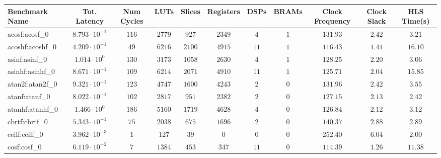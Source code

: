 \begin{tabular}{|l|c|c|c|c|c|c|c|c|c|c|}
\hline
Benchmark Name               & Tot. Latency            & Num Cycles & LUTs       & Slices    & Registers & DSPs    & BRAMs & Clock Frequency & Clock Slack & HLS Time(s) \\
\hline
acosf:acosf\_0               & $ 8.793 \cdot 10^{-1} $ & $ 116    $ & $ 2779   $ & $ 927   $ & $ 2349  $ & $ 4   $ & $ 1 $ & $ 131.93      $ & $ 2.42    $ & $ 3.21    $ \\
acoshf:acoshf\_0             & $ 4.209 \cdot 10^{-1} $ & $ 49     $ & $ 6216   $ & $ 2100  $ & $ 4915  $ & $ 11  $ & $ 1 $ & $ 116.43      $ & $ 1.41    $ & $ 16.10   $ \\
asinf:asinf\_0               & $ 1.014 \cdot 10^{0}  $ & $ 130    $ & $ 3173   $ & $ 1058  $ & $ 2630  $ & $ 4   $ & $ 1 $ & $ 128.25      $ & $ 2.20    $ & $ 3.06    $ \\
asinhf:asinhf\_0             & $ 8.671 \cdot 10^{-1} $ & $ 109    $ & $ 6214   $ & $ 2071  $ & $ 4910  $ & $ 11  $ & $ 1 $ & $ 125.71      $ & $ 2.04    $ & $ 15.85   $ \\
atan2f:atan2f\_0             & $ 9.321 \cdot 10^{-1} $ & $ 123    $ & $ 4747   $ & $ 1600  $ & $ 4243  $ & $ 2   $ & $ 0 $ & $ 131.96      $ & $ 2.42    $ & $ 3.55    $ \\
atanf:atanf\_0               & $ 8.022 \cdot 10^{-1} $ & $ 102    $ & $ 2817   $ & $ 951   $ & $ 2382  $ & $ 2   $ & $ 0 $ & $ 127.15      $ & $ 2.13    $ & $ 2.42    $ \\
atanhf:atanhf\_0             & $ 1.466 \cdot 10^{0}  $ & $ 186    $ & $ 5160   $ & $ 1719  $ & $ 4628  $ & $ 4   $ & $ 0 $ & $ 126.84      $ & $ 2.12    $ & $ 3.12    $ \\
cbrtf:cbrtf\_0               & $ 5.343 \cdot 10^{-1} $ & $ 75     $ & $ 2038   $ & $ 675   $ & $ 1696  $ & $ 2   $ & $ 0 $ & $ 140.37      $ & $ 2.88    $ & $ 2.89    $ \\
ceilf:ceilf\_0               & $ 3.962 \cdot 10^{-3} $ & $ 1      $ & $ 127    $ & $ 39    $ & $ 0     $ & $ 0   $ & $ 0 $ & $ 252.40      $ & $ 6.04    $ & $ 2.00    $ \\
cosf:cosf\_0                 & $ 6.119 \cdot 10^{-2} $ & $ 7      $ & $ 1384   $ & $ 453   $ & $ 347   $ & $ 11  $ & $ 0 $ & $ 114.39      $ & $ 1.26    $ & $ 11.38   $ \\

\end{tabular}
